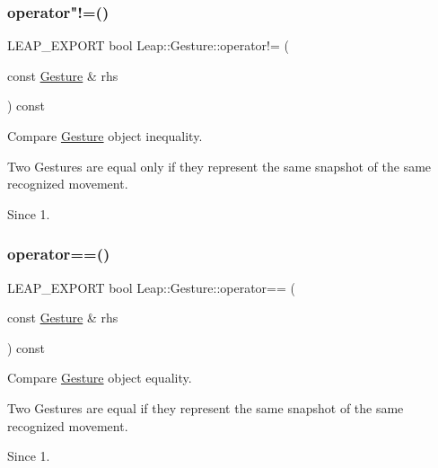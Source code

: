 \subsubsection{\texorpdfstring{operator"!=()}{operator!=()}}
{\footnotesize\ttfamily L\+E\+A\+P\+\_\+\+E\+X\+P\+O\+RT bool Leap\+::\+Gesture\+::operator!= (\begin{DoxyParamCaption}\item[{const \hyperlink{class_leap_1_1_gesture}{Gesture} \&}]{rhs }\end{DoxyParamCaption}) const}

Compare \hyperlink{class_leap_1_1_gesture}{Gesture} object inequality.


\begin{DoxyCodeInclude}
\end{DoxyCodeInclude}


Two Gestures are equal only if they represent the same snapshot of the same recognized movement. \begin{DoxySince}{Since}
1. 
\end{DoxySince}
\mbox{\label{class_leap_1_1_gesture_a73c6d6763eb9c9ad44262e368ea6eedc}} 
\subsubsection{\texorpdfstring{operator==()}{operator==()}}
{\footnotesize\ttfamily L\+E\+A\+P\+\_\+\+E\+X\+P\+O\+RT bool Leap\+::\+Gesture\+::operator== (\begin{DoxyParamCaption}\item[{const \hyperlink{class_leap_1_1_gesture}{Gesture} \&}]{rhs }\end{DoxyParamCaption}) const}

Compare \hyperlink{class_leap_1_1_gesture}{Gesture} object equality.


\begin{DoxyCodeInclude}
\end{DoxyCodeInclude}


Two Gestures are equal if they represent the same snapshot of the same recognized movement. \begin{DoxySince}{Since}
1. 
\end{DoxySince}
\mbox{\label{class_leap_1_1_gesture_a1db8d13c85311388b2cd975b31d81071}} 
